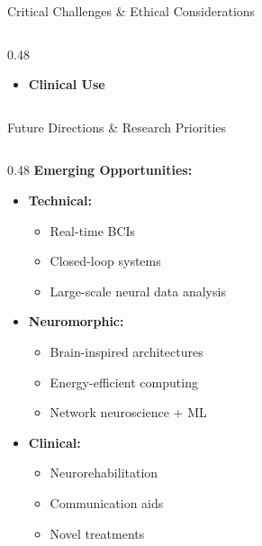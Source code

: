 \documentclass[aspectratio=169]{beamer}
\begin{document}
\begin{frame}{Critical Challenges \& Ethical Considerations}
\begin{columns}[T]
\begin{column}{0.48\textwidth}
\begin{itemize}
        \item \textbf{Clinical Use}
      \end{itemize}
    \end{column}
  \end{columns}
\end{frame}

\begin{frame}{Future Directions \& Research Priorities}
  \begin{columns}[T]
    \begin{column}{0.48\textwidth}
      \textbf{Emerging Opportunities:}
      \begin{itemize}
        \item \textbf{Technical:}
        \begin{itemize}
          \item Real-time BCIs \cite{zhangBrainComputerInterfaces2024}
          \item Closed-loop systems
          \item Large-scale neural data analysis
        \end{itemize}
        
        \item \textbf{Neuromorphic:}
        \begin{itemize}
          \item Brain-inspired architectures \cite{schmidgallBraininspiredLearningArtificial2024}
          \item Energy-efficient computing
          \item Network neuroscience + ML \cite{bassettNetworkNeuroscience2017}
        \end{itemize}
        
        \item \textbf{Clinical:} \cite{nenningMachineLearningNeuroimaging2022}
        \begin{itemize}
          \item Neurorehabilitation
          \item Communication aids
          \item Novel treatments
        \end{itemize}
      \end{itemize}
    \end{column}
    

\end{columns}
\end{frame}
\end{document}
